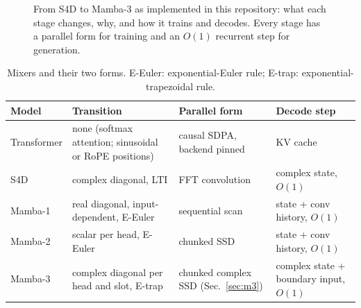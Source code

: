 \documentclass[conference]{IEEEtran}
\newcommand{\stagetext}[1]{\parbox[t][4.5cm][t]{\linewidth}{\raggedright
  \rightskip=0pt plus 1fil\relax #1}}
\newcommand{\mamba}{Mamba}
\begin{document}
\begin{figure}[t]
\caption{From S4D to \mamba{}-3 as implemented in this repository: what each
stage changes, why, and how it trains and decodes. Every stage has a parallel
form for training and an $O(1)$ recurrent step for generation.}
\label{fig:evo}
\end{figure}

\begin{table}[t]
\centering
\caption{Mixers and their two forms. E-Euler: exponential-Euler rule; E-trap:
exponential-trapezoidal rule.}
\label{tab:arch}
\small
\begin{tabular}{@{}>{\raggedright\arraybackslash}p{}>{\raggedright\arraybackslash}p{}>{\raggedright\arraybackslash}p{}>{\raggedright\arraybackslash}p{}@{}}
\toprule
Model & Transition & Parallel form & Decode step \\
\midrule
Transformer & none (softmax attention; sinusoidal or RoPE positions) & causal SDPA, backend pinned & KV cache \\
S4D & complex diagonal, LTI & FFT convolution & complex state, $O(1)$ \\
\mamba{}-1 & real diagonal, input-dependent, E-Euler & sequential scan & state + conv history, $O(1)$ \\
\mamba{}-2 & scalar per head, E-Euler & chunked SSD & state + conv history, $O(1)$ \\
\mamba{}-3 & complex diagonal per head and slot, E-trap & chunked complex SSD (Sec.~\ref{sec:m3}) & complex state + boundary input, $O(1)$ \\
\bottomrule
\end{tabular}
\end{table}
\end{document}
